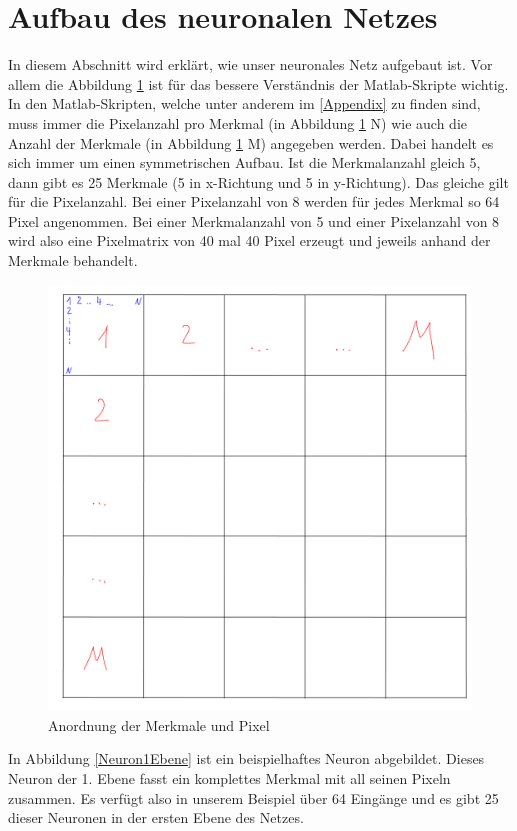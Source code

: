 \newpage
\section{Aufbau des neuronalen Netzes}

In diesem Abschnitt wird erklärt, wie unser neuronales Netz aufgebaut ist. Vor allem die Abbildung \ref{AnordungMerkuPix} ist für das bessere Verständnis der Matlab-Skripte wichtig. In den Matlab-Skripten, welche unter anderem im \ref{Appendix} zu finden sind, muss immer die Pixelanzahl pro Merkmal (in Abbildung \ref{AnordungMerkuPix} N) wie auch die Anzahl der Merkmale (in Abbildung \ref{AnordungMerkuPix} M) angegeben werden. Dabei handelt es sich immer um einen symmetrischen Aufbau. Ist die Merkmalanzahl gleich 5, dann gibt es 25 Merkmale (5 in x-Richtung und 5 in y-Richtung). Das gleiche gilt für die Pixelanzahl. Bei einer Pixelanzahl von 8 werden für jedes Merkmal so 64 Pixel angenommen. Bei einer Merkmalanzahl von 5 und einer Pixelanzahl von 8 wird also eine Pixelmatrix von 40 mal 40 Pixel erzeugt und jeweils anhand der Merkmale behandelt.

\begin{figure}[hbt]
	\centering
	\includegraphics[width=0.8\linewidth]{./Bilder/Auswertung/Aufbau/page4}
	\caption{Anordnung der Merkmale und Pixel}
	\label{AnordungMerkuPix}
\end{figure}

In Abbildung \ref{Neuron1Ebene} ist ein beispielhaftes Neuron abgebildet. Dieses Neuron der 1. Ebene fasst ein komplettes Merkmal mit all seinen Pixeln zusammen. Es verfügt also in unserem Beispiel über 64 Eingänge und es gibt 25 dieser Neuronen in der ersten Ebene des Netzes.


